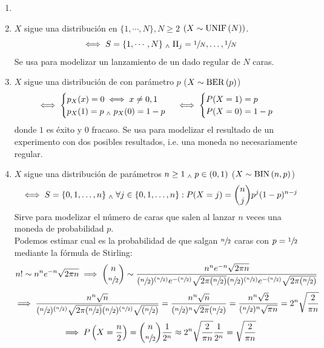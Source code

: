 \begin{ejem}
	\begin{enumerate}
		\item []
		\item $X$ sigue una distribución  en $\{1, \cdots, N\}, N\geq2$ $(X\sim\operatorname{UNIF}\left(N\right))$.
		      \[\iff S=\{1, \cdots, N\} \; _{\wedge} \; {\Pi_j}={\sfrac{1}{N}, \dots, \sfrac{1}{N}}\]
		      Se usa para modelizar un lanzamiento de un dado regular de $N$ caras.
		\item $X$ sigue una distribución de  con parámetro $p$ ($X\sim\operatorname{BER}\left(p\right)$)
		      \[\iff \begin{cases}
				      p_X(x)=0 \iff x\ne 0, 1 \\
				      p_X(1)=p \; _{\wedge} \; p_X(0)=1-p
			      \end{cases}\iff\begin{cases}
				      P(X=1)=p \\
				      P(X=0)=1-p
			      \end{cases}\]
		      donde $1$ es éxito y $0$ fracaso. Se usa para modelizar el resultado de un
		      experimento con dos posibles resultados, i.e. una moneda no necesariamente
		      regular.
		\item $X$ sigue una distribución  de parámetros $n\geq 1 \; _{\wedge} \; p\in (0, 1)$ ($X\sim\operatorname{BIN}\left(n, p\right)$)
		      \[\iff S=\{0, 1, \dots, n\} \; _{\wedge} \; \forall j\in \{0, 1, \dots, n\}:P(X=j)=\binom{n}{j}p^j(1-p)^{n-j}\]
		      Sirve para modelizar el número de caras que salen al lanzar $n$ veces una
		      moneda de probabilidad $p$. \\
		      Podemos estimar cual es la probabilidad de que salgan $\sfrac{n}{2}$ caras con $p=\sfrac{1}{2}$ mediante la fórmula de Stirling:
		      \[n! \sim n^ne^{-n}\sqrt{2\pi n}\implies \binom{n}{\sfrac{n}{2}}\sim\frac{n^ne^{-n}\sqrt{2\pi n}}{(\sfrac{n}        {2})^{(\sfrac{n}{2})}e^{-(\sfrac{n}{2})}\sqrt{2\pi (\sfrac{n}{2})}(\sfrac{n}{2})^{(\sfrac{n}{2})}e^{-(\sfrac{n}     {2})}\sqrt{2\pi (\sfrac{n}{2})}}\]
		      \[\implies \frac{n^n\sqrt{n}}{(\sfrac{n}{2})^{(\sfrac{n}{2})}\sqrt{2\pi (\sfrac{n}{2})}(\sfrac{n}{2})^{(\sfrac{n}       {2})}\sqrt{(\sfrac{n}{2})}} =
			      \frac{n^n\sqrt{n}}
			      {(\sfrac{n}{2})^{n}\sqrt{2\pi}(\sfrac{n}        {2})}=\frac{n^n\sqrt{2}}{(\sfrac{n}{2})^n\sqrt{\pi      n}}=2^n\sqrt{\frac{2}{\pi n}}\]
		      \[\implies P\left(X=\frac{n}{2}\right) = \binom{n}{\sfrac{n}{2}}\frac{1}{2^n}\approx 2^n\sqrt{\frac{2}{\pi n}}\frac{1}{2^n}=\sqrt{\frac{2}{\pi n}}\]

\end{enumerate}
\end{ejem}
